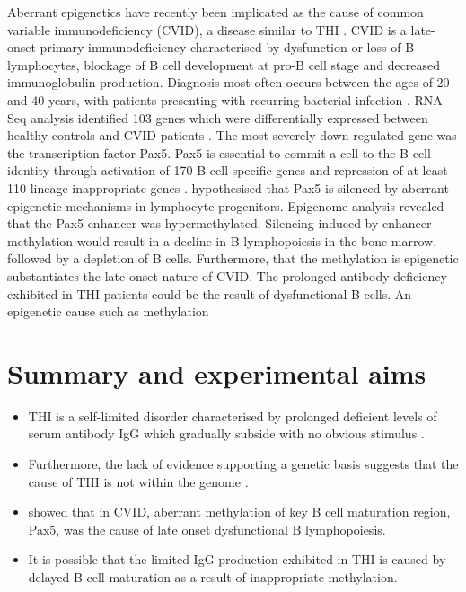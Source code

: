 \documentclass[12pt]{article}
\begin{document}
			Aberrant epigenetics have recently been implicated as the cause of common variable immunodeficiency (CVID), a disease similar to THI \citep{Tallmadge15}.
			CVID is a late-onset primary immunodeficiency characterised by dysfunction or loss of B lymphocytes, blockage of B cell development at pro-B cell stage and decreased immunoglobulin production. 
			Diagnosis most often occurs between the ages of 20 and 40 years, with patients presenting with recurring bacterial infection \citep{Cunningham-Rundles12}.
			RNA-Seq analysis identified 103 genes which were differentially expressed between healthy controls and CVID patients \citep{Tallmadge15}.
			The most severely down-regulated gene was the transcription factor Pax5.
			Pax5 is essential to commit a cell to the B cell identity through activation of 170 B cell specific genes and repression of at least 110 lineage inappropriate genes \citep{Schebesta07,Delogu06,Roessler07}.
			\citet{Tallmadge15} hypothesised that Pax5 is silenced by aberrant epigenetic mechanisms in lymphocyte progenitors. 
			Epigenome analysis revealed that the Pax5 enhancer was hypermethylated.
			Silencing induced by enhancer methylation would result in a decline in B lymphopoiesis in the bone marrow, followed by a depletion of B cells.
			Furthermore, that the methylation is epigenetic substantiates the late-onset nature of CVID. 
			The prolonged antibody deficiency exhibited in THI patients could be the result of dysfunctional B cells. 
			An epigenetic cause such as methylation 
	
	
		
	\section{Summary and experimental aims}

		\begin{mybox}
			
			\begin{itemize}

				\item THI is a self-limited disorder characterised by prolonged deficient levels of serum antibody IgG which gradually subside with no obvious stimulus \citep{Tiller78,Soothill68,Siegel81,McGeady87,Dressler89,Kowalczyk97,Dalal98,AlHerz14,Gitlin56,AlHerz11,Rosen66,Stiemh80,Buckley83}.
				\item Furthermore, the lack of evidence supporting a genetic basis suggests that the cause of THI is not within the genome \citep{Tiller78,Fiorilli86,Ovadia14}.
				\item \citet{Tallmadge15} showed that in CVID, aberrant methylation of key B cell maturation region, Pax5, was the cause of late onset dysfunctional B lymphopoiesis.
				\item It is possible that the limited IgG production exhibited in THI is caused by delayed B cell maturation as a result of inappropriate methylation.
				
			\end{itemize}

		\end{mybox}
\end{document}
